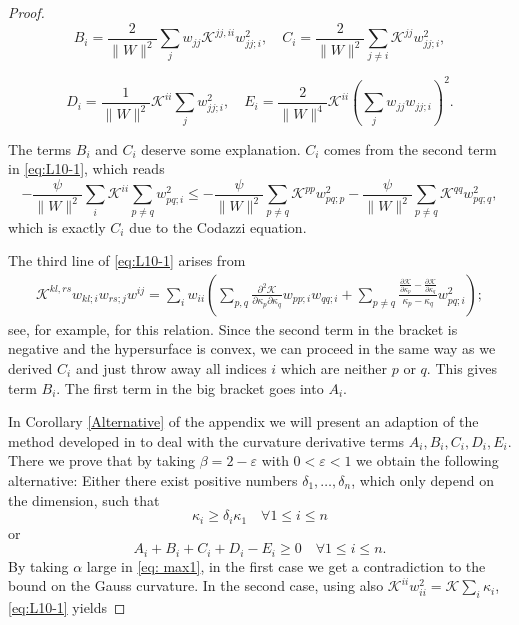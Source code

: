 \documentclass{amsart}
\theoremstyle{definition}
\theoremstyle{remark}
\numberwithin{equation}{section}
\begin{document}
\begin{proof}
\[B_i=\frac{2}{\|W\|^2}\sum_{j}w_{jj}\mathcal{K}^{jj,ii}w^2_{jj;i},\quad C_i=\frac{2}{\|W\|^2}\sum_{j\neq i}\mathcal{K}^{jj}w_{jj;i}^2,\]

\[D_i=\frac{1}{\|W\|^2}\mathcal{K}^{ii}\sum_j w_{jj;i}^2,\quad
E_i=\frac{2}{\|W\|^4}\mathcal{K}^{ii}\left(\sum_j w_{jj}w_{jj;i}\right)^2.\]

The terms $B_i$ and $C_i$ deserve some explanation. $C_i$ comes from the second term in \eqref{eq:L10-1}, which reads
\[-\frac{\psi}{\|W\|^2}\sum_i\mathcal{K}^{ii}\sum_{p\neq q}w_{pq;i}^2\leq -\frac{\psi}{\|W\|^2}\sum_{p\neq q}\mathcal{K}^{pp}w_{pq;p}^2-\frac{\psi}{\|W\|^2}\sum_{p\neq q}\mathcal{K}^{qq}w_{pq;q}^2, \]
which is exactly $C_i$ due to the Codazzi equation.

The third line of \eqref{eq:L10-1} arises from
\begin{align*}
\mathcal{K}^{kl,rs}w_{kl;i}w_{rs;j}w^{ij}=\sum_i w_{ii}\left(\sum_{p,q}\frac{\partial^2\mathcal{K}}{\partial \kappa_p\partial\kappa_q}w_{pp;i}w_{qq;i}+\sum_{p\neq q}\frac{\frac{\partial\mathcal{K}}{\partial \kappa_p}-\frac{\partial\mathcal{K}}{\partial\kappa_q}}{\kappa_p-\kappa_q} w_{pq;i}^2\right);
\end{align*}
see, for example, \cite[Lemma~2.1.14]{Gerhardt:/2006} for this relation. Since the second term in the bracket is negative and the hypersurface is convex, we can proceed in the same way as we derived $C_i$ and just throw away all indices $i$ which are neither $p$ or $q$. This gives term $B_i$. The first term in the big bracket goes into $A_i$.


In Corollary \ref{Alternative} of the appendix we will present an adaption of the method developed in \cite{Guan} to deal with the curvature derivative terms $A_i,B_i,C_i,D_i,E_i$. There we prove that by taking $\beta=2-\varepsilon$ with $0<\varepsilon<1$ we obtain the following alternative: Either there exist positive numbers $\delta_1,\dots,\delta_n$, which only depend on the dimension, such that
\[\kappa_i\geq \delta_i\kappa_1\quad\forall 1\leq i\leq n\]
or
\[A_i+B_i+C_i+D_i-E_i\geq 0\quad\forall 1\leq i\leq n.\]
By taking $\alpha$ large in \eqref{eq: max1}, in the first case we get a contradiction to the bound on the Gauss curvature. In the second case, using also $\mathcal{K}^{ii}w_{ii}^2 = \mathcal{K} \sum_i \kappa_i$, \eqref{eq:L10-1} yields



\end{proof}
\end{document}
